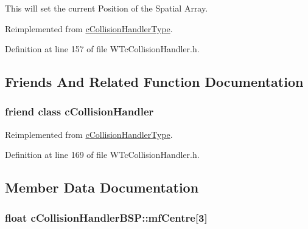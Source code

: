 This will set the current Position of the Spatial Array. 



Reimplemented from \hyperlink{classc_collision_handler_type_a56be05fb67ba225b671c6b38e05cc762}{cCollisionHandlerType}.



Definition at line 157 of file WTcCollisionHandler.h.



\subsection{Friends And Related Function Documentation}
\hypertarget{classc_collision_handler_b_s_p_a2dee8095fea5c5aa41fe4060393f31ad}{
\subsubsection[{cCollisionHandler}]{\setlength{\rightskip}{0pt plus 5cm}friend class {\bf cCollisionHandler}}}
\label{classc_collision_handler_b_s_p_a2dee8095fea5c5aa41fe4060393f31ad}


Reimplemented from \hyperlink{classc_collision_handler_type_a2dee8095fea5c5aa41fe4060393f31ad}{cCollisionHandlerType}.



Definition at line 169 of file WTcCollisionHandler.h.



\subsection{Member Data Documentation}
\hypertarget{classc_collision_handler_b_s_p_a2f5ddea62a1158ccdfc29539a9c23a8d}{
\subsubsection[{mfCentre}]{\setlength{\rightskip}{0pt plus 5cm}float {\bf cCollisionHandlerBSP::mfCentre}\mbox{[}3\mbox{]}}}
\label{classc_collision_handler_b_s_p_a2f5ddea62a1158ccdfc29539a9c23a8d}


